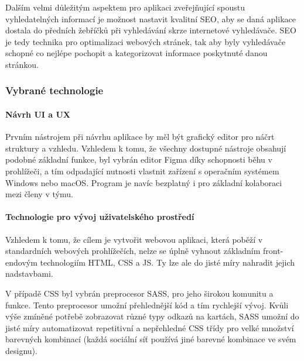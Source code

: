 		Dalším velmi důležitým aspektem pro aplikaci zveřejňující spoustu vyhledatelných informací je možnost nastavit
		kvalitní \ac{SEO}, aby se daná aplikace dostala do předních žebříčků při vyhledávání skrze internetové
		vyhledávače.
		\Ac{SEO} je tedy technika pro optimalizaci webových stránek, tak aby byly vyhledávače schopné co
		nejlépe pochopit a kategorizovat informace poskytnuté
		danou stránkou. \cite{what_is_seo}

		\subsubsection{Vybrané technologie}

			\paragraph{Návrh UI a UX}

			Prvním nástrojem při návrhu aplikace by měl být grafický editor pro náčrt struktury a vzhledu.
			Vzhledem k tomu, že všechny dostupné nástroje obsahují podobné základní funkce, byl vybrán editor Figma díky
			schopnosti běhu v prohlížeči, a tím odpadající nutnosti vlastnit zařízení s operačním systémem Windows nebo macOS.
			Program je navíc bezplatný i pro základní kolaboraci mezi členy v týmu.

			\paragraph{Technologie pro vývoj uživatelského prostředí}

			Vzhledem k tomu, že cílem je vytvořit webovou aplikaci, která poběží v standardních webových prohlížečích,
			nelze se úplně vyhnout základním front-endovým technologiím \Ac{HTML}, \Ac{CSS} a \ac{JS}.
			Ty lze ale do jisté míry nahradit jejich nadstavbami.

			V případě \Ac{CSS} byl vybrán preprocesor \Ac{SASS}, pro jeho širokou komunitu a funkce.
			Tento preprocesor umožní přehlednější kód a tím rychlejší vývoj.
			Kvůli výše zmíněné potřebě zobrazovat různé typy odkazů na kartách, \ac{SASS} umožní
			do jisté míry automatizovat repetitivní a nepřehledné \ac{CSS} třídy pro velké množství barevných kombinací
			(každá sociální síť používá jiné barevné kombinace ve svém designu).

